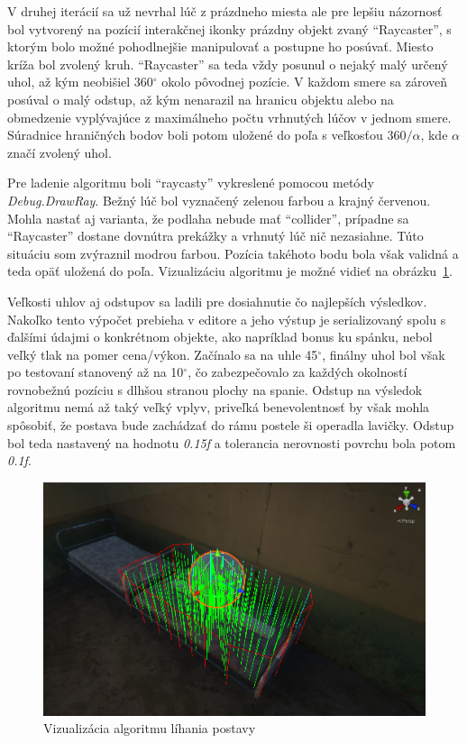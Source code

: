 \documentclass[slovak, bachelorpractice]{diploma}
\begin{document}
V druhej iterácií sa už nevrhal lúč z prázdneho miesta ale pre lepšiu názornosť bol vytvorený na pozícií interakčnej ikonky prázdny objekt zvaný \enquote{Raycaster}, s ktorým bolo možné pohodlnejšie manipulovať a postupne ho posúvať. Miesto kríža bol zvolený kruh. \enquote{Raycaster} sa teda vždy posunul o nejaký malý určený uhol, až kým neobišiel 360$^{\circ}$ okolo pôvodnej pozície. V každom smere sa zároveň posúval o malý odstup, až kým nenarazil na hranicu objektu alebo na obmedzenie vyplývajúce z maximálneho počtu vrhnutých lúčov v jednom smere. Súradnice hraničných bodov boli potom uložené do poľa s veľkosťou $360/\alpha$, kde $\alpha$ značí zvolený uhol. 

Pre ladenie algoritmu boli \enquote{raycasty} vykreslené pomocou metódy \textit{Debug.DrawRay}. Bežný lúč bol vyznačený zelenou farbou a krajný červenou. Mohla nastať aj varianta, že podlaha nebude mať \enquote{collider}, prípadne sa \enquote{Raycaster} dostane dovnútra prekážky a vrhnutý lúč nič nezasiahne. Túto situáciu som zvýraznil modrou farbou. Pozícia takéhoto bodu bola však validná a teda opäť uložená do poľa. Vizualizáciu algoritmu je možné vidieť na \mbox{obrázku \ref{pic:algviz}}.

Veľkosti uhlov aj odstupov sa ladili pre dosiahnutie čo najlepších výsledkov. Nakoľko tento výpočet prebieha v editore a jeho výstup je serializovaný spolu s ďalšími údajmi o konkrétnom objekte, ako napríklad bonus ku spánku, nebol veľký tlak na pomer cena/výkon. Začínalo sa na uhle 45$^{\circ}$, finálny uhol bol však po testovaní stanovený až na 10$^{\circ}$, čo zabezpečovalo za každých okolností rovnobežnú pozíciu s dlhšou stranou plochy na spanie. Odstup na výsledok algoritmu nemá až taký veľký vplyv, priveľká benevolentnosť by však mohla spôsobiť, že postava bude zachádzať do rámu postele ši operadla lavičky. Odstup bol teda nastavený na hodnotu \textit{0.15f} a tolerancia nerovnosti povrchu bola potom \textit{0.1f}. 

\begin{figure}[!htbp]
	\centering
	\includegraphics[width=1\textwidth]{Pictures/algviz.png}
	\caption{Vizualizácia algoritmu líhania postavy}
	\label{pic:algviz}
\end{figure}
\end{document}
